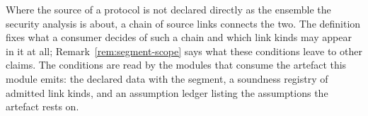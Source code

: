 
Where the source of a protocol is not declared directly as the ensemble the
security analysis is about, a chain of source links connects the two. The
definition fixes what a consumer decides of such a chain and which link kinds
may appear in it at all; Remark~\ref{rem:segment-scope} says what these
conditions leave to other claims. The conditions are read by the modules
that consume the artefact this module emits: the declared data with the
segment, a soundness registry of admitted link kinds, and an assumption
ledger listing the assumptions the artefact rests on.

